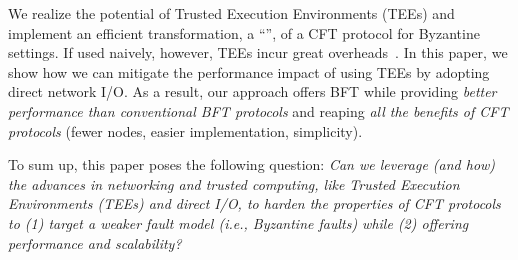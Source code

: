
We realize the potential of Trusted Execution Environments (TEEs) and implement an efficient transformation, a ``\projecttitle{}'', of a CFT protocol for Byzantine settings.  If used naively, however, TEEs incur great overheads~\cite{10.5555/1924943.1924946}. In this paper, we show how we can mitigate the performance impact of using TEEs by adopting direct network I/O. As a result, our approach offers BFT while providing {\em better performance than conventional BFT protocols} and reaping {\em all the benefits of CFT protocols} (fewer nodes, easier implementation, simplicity).



To sum up, this paper poses the following question: \emph{Can we leverage (and how) the advances in networking and trusted computing, like Trusted Execution Environments (TEEs) and direct I/O, to harden the properties of CFT protocols to (1) target a weaker fault model (i.e., Byzantine faults) while (2) offering performance and scalability?}  %



